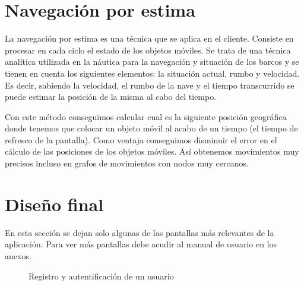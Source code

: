 \newpage

\section{Navegación por estima}


La navegación por estima es una técnica que se aplica en el cliente. Consiste en procesar en cada ciclo el estado de los objetos móviles. Se trata de una técnica analítica utilizada en la náutica para la navegación y situación de los barcos y se tienen en cuenta los siguientes elementos: la situación actual, rumbo y velocidad. Es decir, sabiendo la velocidad, el rumbo de la nave y el tiempo transcurrido se puede estimar la posición de la misma al cabo del tiempo. 

Con este método conseguimos calcular cual es la siguiente posición geográfica donde tenemos que colocar un objeto móvil al acabo de un tiempo (el tiempo de refresco de la pantalla). Como ventaja conseguimos disminuir el error en el cálculo de las posiciones de los objetos móviles. Así obtenemos movimientos muy precisos incluso en grafos de movimientos con nodos muy cercanos.

\section{Diseño final}

En esta sección se dejan solo algunas de las pantallas más relevantes de la aplicación. Para ver más pantallas debe acudir al manual de usuario en los anexos.

\begin{figure}[H]
 \centering
 \caption{Registro y autentificación de un usuario}
 \label{f:LoginRegister}
\end{figure}

